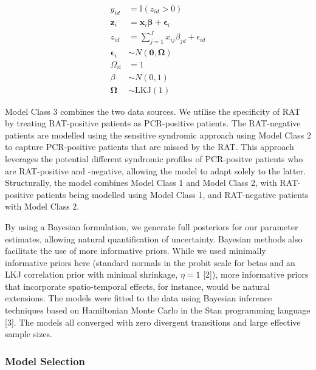 \documentclass[]{elsarticle} %
\begin{document}
\begin{equation}\begin{aligned}
y_{id} &= \mathbb{I}(z_{id} > 0) \\
\boldsymbol{z}_{i} &= \boldsymbol{x}_i \boldsymbol{\beta} + \boldsymbol{\epsilon}_{i} \\
z_{id} &= \sum_{j=1}^J x_{ij}\beta_{jd} + \epsilon_{id} \\
\boldsymbol{\epsilon}_i &\sim N(\boldsymbol{0}, \boldsymbol{\Omega}) \\
\Omega_{ii}&=1 \\
{\beta} &\sim N(0,1) \\
\boldsymbol{\Omega} &\sim \text{LKJ}(1)
\label{eq:ModelClass2}
\end{aligned}\end{equation}\ignorespacesafterend

Model Class 3 combines the two data sources.
We utilise the specificity of RAT by treating RAT-positive patients as PCR-positive patients.
The RAT-negative patients are modelled using the sensitive syndromic approach using Model Class 2 to capture PCR-positive patients that are missed by the RAT.
This approach leverages the potential different syndromic profiles of PCR-positve patients who are RAT-positive and -negative, allowing the model to adapt solely to the latter.
Structurally, the model combines Model Class 1 and Model Class 2, with RAT-positive patients being modelled using Model Class 1, and RAT-negative patients with Model Class 2.

By using a Bayesian formulation, we generate full posteriors for our parameter estimates, allowing natural quantification of uncertainty.
Bayesian methods also facilitate the use of more informative priors.
While we used minimally informative priors here (standard normals in the probit scale for betas and an LKJ correlation prior with minimal shrinkage, \(\eta=1\) {[}2{]}), more informative priors that incorporate spatio-temporal effects, for instance, would be natural extensions.
The models were fitted to the data using Bayesian inference techniques based on Hamiltonian Monte Carlo in the Stan programming language {[}3{]}.
The models all converged with zero divergent transitions and large effective sample sizes.

\hypertarget{model-selection}{%
\subsubsection{Model Selection}\label{model-selection}}
\end{document}
